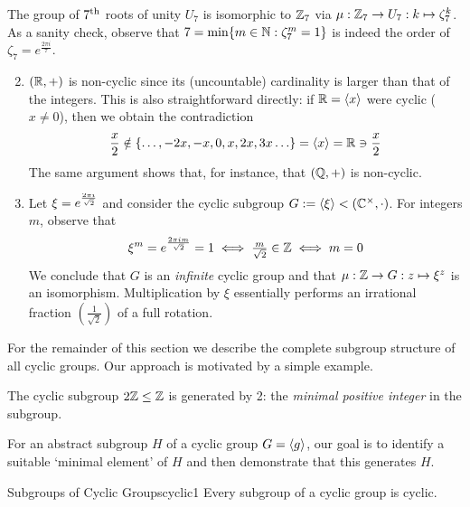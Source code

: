 \begin{examples}{}{}
	\exstart The group of $7\textsuperscript{th}$ roots of unity $U_7$ is isomorphic to $\mathbb{Z}_7$ via $\mu:\mathbb{Z}_7\to U_7:k\mapsto \zeta_7^k$. As a sanity check, observe that $7=\min\{m\in\mathbb{N}:\zeta_7^m=1\}$ is indeed the order of $\zeta_7 =e^{\frac{2\pi i}7}$.
	\begin{enumerate}\setcounter{enumi}{1}
		\item $(\mathbb{R},+)$ is non-cyclic since its (uncountable) cardinality is larger than that of the integers. This is also straightforward directly: if $\mathbb{R}=\left\langle x\right\rangle$ were cyclic ($x\neq 0$), then we obtain the contradiction
		\[
			\frac x2\notin\{\ldots,-2x,-x,0,x,2x,3x\ldots\}=\left\langle x\right\rangle=\mathbb{R}\ni\frac x2
		\]
		The same argument shows that, for instance, that $(\mathbb{Q},+)$ is non-cyclic.
		
		\item Let $\xi=\smash[t]{e^{\frac{2\pi i}{\sqrt 2}}}$ and consider the cyclic subgroup $G:=\left\langle \xi\right\rangle<(\mathbb{C}^\times,\cdot)$. For integers $m$, observe that
		\[
			\xi^m=e^{\frac{2\pi im}{\sqrt 2}}=1\iff \tfrac m{\sqrt 2}\in\mathbb{Z}\iff m=0
		\]
		We conclude that $G$ is an \emph{infinite} cyclic group and that $\mu:\mathbb{Z}\to G:z\mapsto\xi^z$ is an isomorphism. Multiplication by $\xi$ essentially performs an irrational fraction $(\frac 1{\sqrt 2})$ of a full rotation.
	\end{enumerate}
\end{examples}


\goodbreak



For the remainder of this section we describe the complete subgroup structure of all cyclic groups. Our approach is motivated by a simple example.

\begin{example}{}{}
	The cyclic subgroup $2\mathbb{Z}\le\mathbb{Z}$ is generated by 2: the \emph{minimal positive integer} in the subgroup.
\end{example}

For an abstract subgroup $H$ of a cyclic group $G=\left\langle g\right\rangle$, our goal is to identify a suitable `minimal element' of $H$ and then demonstrate that this generates $H$.

\begin{thm}{Subgroups of Cyclic Groups}{cyclic1}
	Every subgroup of a cyclic group is cyclic.
\end{thm}

